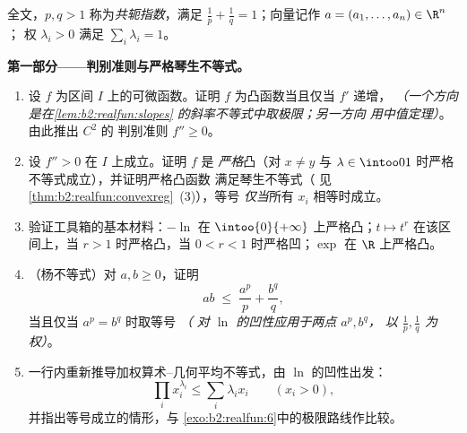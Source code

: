 \begin{problem}
\label{pb:b2:realfun:1}
全文，$p, q > 1$ 称为\emph{共轭指数}，满足 $\frac1p +
\frac1q = 1$；向量记作 $a = (a_1, \dots, a_n) \in \R^n$；
权 $\lambda_i > 0$ 满足 $\sum_i\lambda_i = 1$。

\medskip
\noindent\textbf{第一部分——判别准则与严格琴生不等式。}
\begin{enumerate}
  \item 设 $f$ 为区间 $I$ 上的可微函数。证明
        $f$ 为凸函数当且仅当 $f'$ 递增，
        \emph{（一个方向是在\cref{lem:b2:realfun:slopes}
        的斜率不等式中取极限；另一方向
        用中值定理）}。由此推出 $C^2$ 的
        判别准则 $f'' \geq 0$。
  \item 设 $f''> 0$ 在 $I$ 上成立。证明 $f$ 是
        \emph{严格}凸（对 $x \neq y$
        与 $\lambda \in \intoo01$ 时严格不等式成立），并证明严格凸函数
        满足琴生不等式（
        见\cref{thm:b2:realfun:convexreg}~(3)），等号
        \emph{仅当}所有 $x_i$ 相等时成立。
  \item 验证工具箱的基本材料：$-\ln$ 在
        $\intoo{0}{+\infty}$ 上严格凸；$t \mapsto t^r$ 在该区间上，当 $r > 1$
        时严格凸，当 $0 < r < 1$ 时严格凹；$\exp$ 在 $\R$
        上严格凸。
  \item （杨不等式）对 $a, b \geq 0$，证明
        \[
        ab \;\leq\; \frac{a^p}{p} + \frac{b^q}{q},
        \]
        当且仅当 $a^p = b^q$ 时取等号 \emph{（
        对 $\ln$ 的凹性应用于两点 $a^p, b^q$，
        以 $\frac1p, \frac1q$ 为权）}。
  \item 一行内重新推导加权算术–几何平均不等式，由
        $\ln$ 的凹性出发：
        \[
        \prod_i x_i^{\lambda_i} \leq \sum_i\lambda_ix_i \qquad
        (x_i > 0),
        \]
        并指出等号成立的情形，与
        \cref{exo:b2:realfun:6}中的极限路线作比较。
\end{enumerate}


\end{problem}
